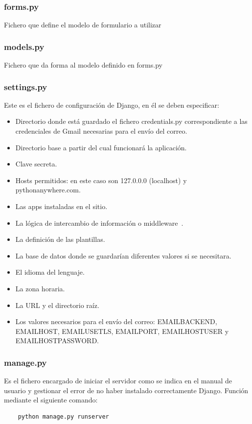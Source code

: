 \documentclass[a4paper, 12pt]{book}
\begin{document}
\subsubsection{forms.py}
Fichero que define el modelo de formulario a utilizar
\subsubsection{models.py}
Fichero que da forma al modelo definido en forms.py
\subsubsection{settings.py}
Este es el fichero de configuración de Django, en él se deben especificar:
\begin{itemize}
	\item Directorio donde está guardado el fichero credentials.py correspondiente a las credenciales de Gmail necesarias para el envío del correo.
	\item Directorio base a partir del cual funcionará la aplicación.
	\item Clave secreta.
	\item Hosts permitidos: en este caso son 127.0.0.0 (localhost) y pythonanywhere.com.
	\item Las apps instaladas en el sitio.
	\item La lógica de intercambio de información o middleware~\cite{website:middleware}.
	\item La definición de las plantillas.
	\item La base de datos donde se guardarían diferentes valores si se necesitara.
	\item El idioma del lenguaje.
	\item La zona horaria.
	\item La URL y el directorio raíz.
	\item Los valores necesarios para el envío del correo: EMAIL\textunderscore BACKEND, EMAIL\textunderscore HOST, EMAIL\textunderscore USE\textunderscore TLS, EMAIL\textunderscore PORT, EMAIL\textunderscore HOST\textunderscore USER y EMAIL\textunderscore HOST\textunderscore PASSWORD.
\end{itemize}
\subsubsection{manage.py}
Es el fichero encargado de iniciar el servidor como se indica en el manual de usuario y gestionar el error de no haber instalado correctamente Django. Función mediante el siguiente comando:
\begin{verbatim}
	python manage.py runserver
\end{verbatim}
\end{document}
